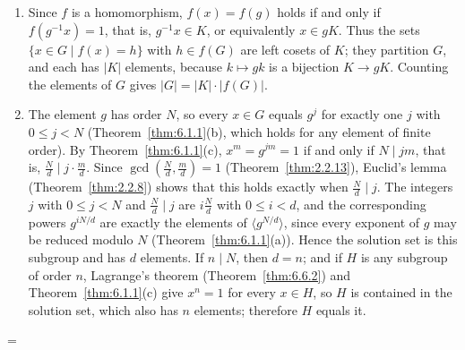 \documentclass[11pt]{article}
\makeatletter
\let\nt@closedisplay\]
\def\nt@guardedclose{\@ifnextchar\par{\nt@closeafterpar}{\@ifnextchar\end{\postdisplaypenalty\@M\nt@closedisplay}{\nt@closedisplay}}}
\def\nt@closeafterpar\par{\@ifnextchar\par{\nt@closeafterpar}{\@ifnextchar\end{\postdisplaypenalty\@M\nt@closedisplay\par}{\nt@closedisplay\par}}}
\renewenvironment{proof}[1][\proofname]{\par
  \pushQED{\qed}\normalfont\topsep\medskipamount\edef\nt@afterproof{\@endparpenalty=\the\@endparpenalty\relax}\@beginparpenalty\@M\@endparpenalty\@M\let\]\nt@guardedclose\trivlist\item[]\textit{#1\@addpunct{.}} \ignorespaces}{\ifvmode\addpenalty\@M\fi\popQED\nt@afterproof\endtrivlist\@endpefalse}
\theoremstyle{ntstyle}
\makeatother
\begin{document}
\begin{proof}

  \begin{enumerate}[label={\alph*)}]
    \item Since $f$ is a homomorphism, $f(x)=f(g)$ holds if and only if
          $f(g^{-1}x)=1$, that is, $g^{-1}x\in K$, or equivalently $x\in gK$.
          Thus the sets $\{x\in G\mid f(x)=h\}$ with $h\in f(G)$ are left
          cosets of $K$; they partition $G$, and each has $|K|$ elements,
          because $k\mapsto gk$ is a bijection $K\to gK$. Counting the elements
          of $G$ gives $|G|=|K|\cdot|f(G)|$.
    \item The element $g$ has order $N$, so every $x\in G$ equals $g^j$ for
          exactly one $j$ with $0\le j<N$ (Theorem~\ref{thm:6.1.1}(b), which holds
          for any element of finite order). By Theorem~\ref{thm:6.1.1}(c),
          $x^m=g^{jm}=1$ if and only if $N\mid jm$, that is,
          $\tfrac{N}{d}\mid j\cdot\tfrac{m}{d}$. Since $\gcd(\tfrac{N}{d},\tfrac{m}{d})=1$
          (Theorem~\ref{thm:2.2.13}), Euclid's lemma (Theorem~\ref{thm:2.2.8})
          shows that this holds exactly when $\tfrac{N}{d}\mid j$. The integers $j$
          with $0\le j<N$ and $\tfrac{N}{d}\mid j$ are $i\tfrac{N}{d}$ with
          $0\le i<d$, and the corresponding powers $g^{iN/d}$ are exactly the
          elements of $\langle g^{N/d}\rangle$, since every exponent of $g$ may be
          reduced modulo $N$ (Theorem~\ref{thm:6.1.1}(a)). Hence the solution set
          is this subgroup and has $d$ elements. If $n\mid N$, then $d=n$; and if
          $H$ is any subgroup of order $n$, Lagrange's theorem
          (Theorem~\ref{thm:6.6.2}) and Theorem~\ref{thm:6.1.1}(c) give $x^n=1$ for
          every $x\in H$, so $H$ is contained in the solution set, which also has
          $n$ elements; therefore $H$ equals it.\qedhere
\end{enumerate}
\end{proof}
\end{document}
